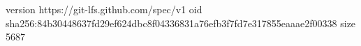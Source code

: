 version https://git-lfs.github.com/spec/v1
oid sha256:84b30448637fd29ef624dbc8f04336831a76efb3f7fd7e317855eaaae2f00338
size 5687
